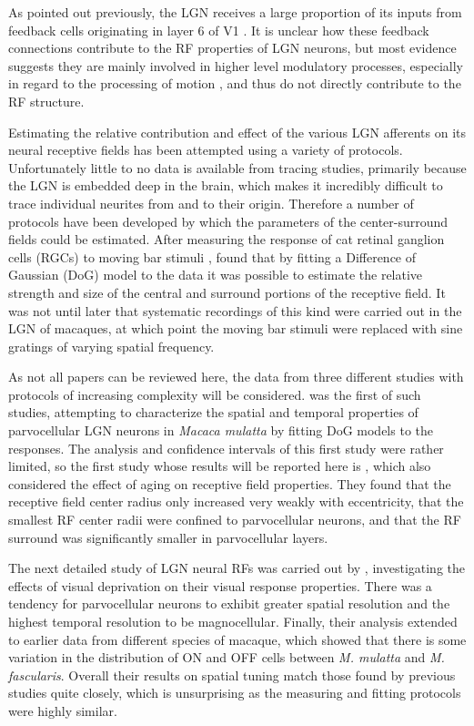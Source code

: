 As pointed out previously, the LGN receives a
large proportion of its inputs from feedback cells originating in
layer 6 of V1 \citep{Sherman2002}. It is unclear how these feedback
connections contribute to the RF properties of LGN neurons, but most
evidence suggests they are mainly involved in higher level modulatory
processes, especially in regard to the processing of motion
\citep{Sillito2006}, and thus do not directly contribute to the RF
structure.

Estimating the relative contribution and effect of the various LGN
afferents on its neural receptive fields has been attempted using a
variety of protocols. Unfortunately little to no data is available
from tracing studies, primarily because the LGN is embedded deep in
the brain, which makes it incredibly difficult to trace individual neurites
from and to their origin. Therefore a number of protocols have been
developed by which the parameters of the center-surround fields could
be estimated. After measuring the response of cat retinal ganglion cells
(RGCs) to moving bar stimuli \citep{Rodieck1965a,Rodieck1965b},
\cite{Rodieck1965} found that by fitting a Difference of Gaussian
(DoG) model to the data it was possible to estimate the relative
strength and size of the central and surround portions of the
receptive field. It was not until later that systematic recordings of
this kind were carried out in the LGN of macaques, at which point the
moving bar stimuli were replaced with sine gratings of varying spatial
frequency.

As not all papers can be reviewed here, the data from three different
studies with protocols of increasing complexity will be
considered. \cite{Derrington1984} was the first of such studies,
attempting to characterize the spatial and temporal properties of
parvocellular LGN neurons in \emph{Macaca mulatta} by fitting DoG
models to the responses. The analysis and confidence intervals of this
first study were rather limited, so the first study whose results will be
reported here is \cite{Spear1994}, which also considered the effect
of aging on receptive field properties. They found that the receptive
field center radius only increased very weakly with eccentricity, that the
smallest RF center radii were confined to parvocellular neurons, and
that the RF surround was significantly smaller in parvocellular
layers.

The next detailed study of LGN neural RFs was carried out by
\cite{Levitt2001}, investigating the effects of visual deprivation on
their visual response properties. There was a tendency for
parvocellular neurons to exhibit greater spatial resolution and the
highest temporal resolution to be magnocellular. Finally, their
analysis extended to earlier data from different species of macaque,
which showed that there is some variation in the distribution of ON
and OFF cells between \emph{M. mulatta} and
\emph{M. fascularis}. Overall their results on spatial tuning match
those found by previous studies quite closely, which is unsurprising
as the measuring and fitting protocols were highly similar.

